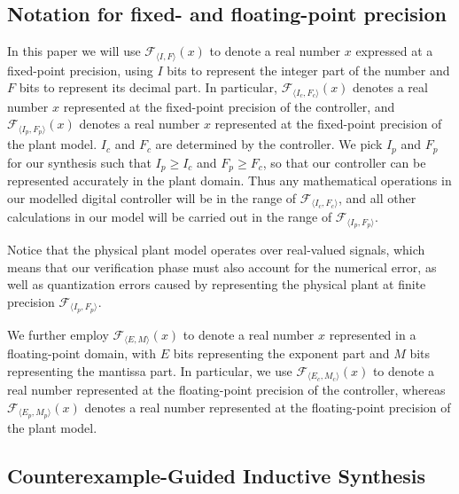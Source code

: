 \subsection{Notation for fixed- and floating-point precision}  

In this paper we will use $\mathcal{F}_{\langle I,F \rangle}(x)$ to denote a real number $x$ expressed at a fixed-point precision, 
using $I$ bits to represent the integer part of the number and $F$ bits to represent its decimal part.  
In particular, $\mathcal{F}_{\langle I_c,F_c \rangle}(x)$ denotes a real number $x$ represented at the fixed-point precision of the controller, 
and $\mathcal{F}_{\langle I_p,F_p \rangle}(x)$ denotes a real number $x$
represented at the fixed-point precision of the plant model. 
$I_c$ and $F_c$ are determined by the controller.  We pick $I_p$ and $F_p$ for our synthesis
such that $I_p \geq I_c$ and $\allowbreak F_p \geq F_c$, so that our controller 
can be represented accurately in the plant domain.    
Thus any mathematical operations in our modelled digital controller will be in the
range of $\mathcal{F}_{\langle I_c,F_c \rangle}$, and all other calculations
in our model will be carried out in the range of $\mathcal{F}_{\langle
I_p,F_p \rangle}$.  

Notice that the physical plant model operates over real-valued signals, 
which means that our verification  phase  must also account for the numerical error, 
as well as quantization errors caused by representing the physical plant at finite precision $\mathcal{F}_{\langle I_p,F_p \rangle}$. 
 
We further employ $\mathcal{F}_{\langle E,M \rangle}(x)$ to denote a real number $x$ represented in a floating-point domain, 
with $E$ bits representing the exponent part and $M$ bits representing the mantissa part. 
In particular, 
we use $\mathcal{F}_{\langle E_c,M_c \rangle}(x)$ to denote a real number 
represented at the floating-point precision of the controller, 
whereas $\mathcal{F}_{\langle E_p,M_p \rangle}(x)$ denotes a real number represented at the floating-point precision of the plant model.  

\subsection{Counterexample-Guided Inductive Synthesis} 
\label{ssec:cegis}

